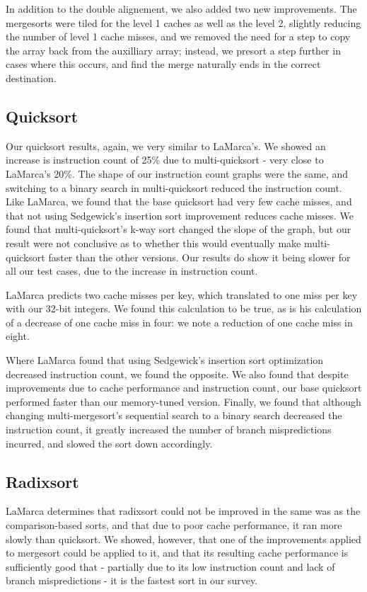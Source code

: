 In addition to the double alignement, we also added two new improvements. The
mergesorts were tiled for the level 1 caches as well as the level 2, slightly
reducing the number of level 1 cache misses, and we removed the need for a step
to copy the array back from the auxilliary array; instead, we presort a step
further in cases where this occurs, and find the merge naturally ends in the
correct destination.


\subsection{Quicksort}

Our quicksort results, again, we very similar to LaMarca's. We showed an
increase is instruction count of 25\% due to multi-quicksort - very close to
LaMarca's 20\%. The shape of our instruction count graphs were the same, and
switching to a binary search in multi-quicksort reduced the instruction count.
Like LaMarca, we found that the base quicksort had very few cache misses, and
that not using Sedgewick's insertion sort improvement reduces cache misses. We
found that multi-quicksort's k-way sort changed the slope of the graph, but our
result were not conclusive as to whether this would eventually make
multi-quicksort faster than the other versions. Our results do show it being
slower for all our test cases, due to the increase in instruction count.

LaMarca predicts two cache misses per key, which translated to one miss per key
with our 32-bit integers. We found this calculation to be true, as is his
calculation of a decrease of one cache miss in four: we note a reduction of one
cache miss in eight.

Where LaMarca found that using Sedgewick's insertion sort optimization decreased
instruction count, we found the opposite. We also found that despite
improvements due to cache performance and instruction count, our base quicksort
performed faster than our memory-tuned version. Finally, we found that although
changing multi-mergesort's sequential search to a binary search decreased the
instruction count, it greatly increased the number of branch mispredictions
incurred, and slowed the sort down accordingly.


\subsection{Radixsort}

LaMarca determines that radixsort could not be improved in the same was as the
comparison-based sorts, and that due to poor cache performance, it ran more
slowly than quicksort. We showed, however, that one of the improvements applied
to mergesort could be applied to it, and that its resulting cache performance is
sufficiently good that - partially due to its low instruction count and lack of
branch mispredictions - it is the fastest sort in our survey.


